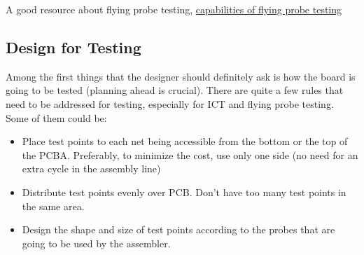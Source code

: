 \documentclass[12pt]{article}
\begin{document}

A good resource about flying probe testing, \href{https://blog.matric.com/flying-probe-test-capabilities}{capabilities of flying probe testing}





\subsection{Design for Testing}



Among the first things that the designer should definitely ask is how the board is going to be tested (planning ahead is crucial). There are quite a few rules that need to be addressed for testing, especially for ICT and flying probe testing. Some of them could be:

\begin{itemize}
	\item Place test points to each net being accessible from the bottom or the top of the PCBA. Preferably, to minimize the cost, use only one side (no need for an extra cycle in the assembly line) 
	
	
	\item Distribute test points evenly over PCB. Don't have too many test points in the same area. 
	\item Design the shape and size of test points according to the probes that are going to be used by the assembler.
\end{itemize}
\end{document}
